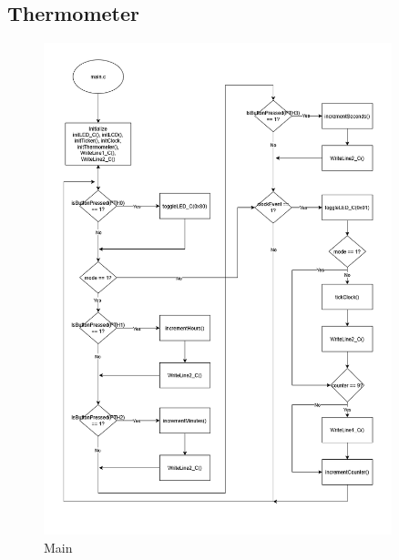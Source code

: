 \documentclass[a4paper,12pt]{article}
\begin{document}
\subsection{Thermometer}
\begin{figure}[H]
    \centering
    \includegraphics[width=0.9\textwidth]{diagrams/main(1).png}
    \caption{Main}
    \label{fig:Main}
\end{figure}

\newpage
\end{document}

